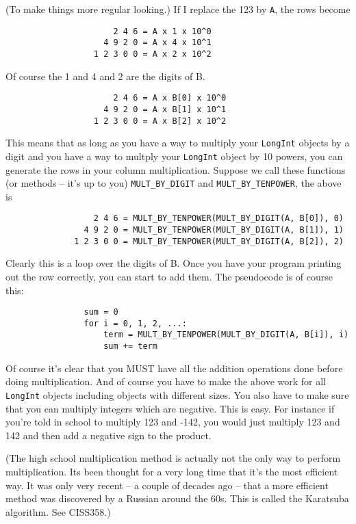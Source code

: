 (To make things more regular looking.) If I replace the 123 by \verb!A!, 
the rows become

\begin{Verbatim}
                      2 4 6 = A x 1 x 10^0
                    4 9 2 0 = A x 4 x 10^1
                  1 2 3 0 0 = A x 2 x 10^2
\end{Verbatim}

Of course the 1 and 4 and 2 are the digits of B.

\begin{Verbatim}
                      2 4 6 = A x B[0] x 10^0
                    4 9 2 0 = A x B[1] x 10^1
                  1 2 3 0 0 = A x B[2] x 10^2
\end{Verbatim}

This means that as long as you have a way to multiply your 
\verb!LongInt! objects by a digit and you have a way to multply 
your \verb!LongInt! object by 10 powers, you can generate the 
rows in your column multiplication. Suppose we call these 
functions (or methods – it's up to you) \verb!MULT_BY_DIGIT! 
and \verb!MULT_BY_TENPOWER!, the above is

\begin{Verbatim}
                  2 4 6 = MULT_BY_TENPOWER(MULT_BY_DIGIT(A, B[0]), 0)
                4 9 2 0 = MULT_BY_TENPOWER(MULT_BY_DIGIT(A, B[1]), 1)
              1 2 3 0 0 = MULT_BY_TENPOWER(MULT_BY_DIGIT(A, B[2]), 2)
\end{Verbatim}

Clearly this is a loop over the digits of B. Once you have your program 
printing out the row correctly, you can start to add them. The 
pseudocode is of course this:

\begin{Verbatim}
                sum = 0
                for i = 0, 1, 2, ...:
                    term = MULT_BY_TENPOWER(MULT_BY_DIGIT(A, B[i]), i)
                    sum += term
\end{Verbatim}

Of course it's clear that you MUST have all the addition operations 
done before doing multiplication. And of course you have to make the 
above work for all \verb!LongInt! objects including objects with 
different sizes. You also have to make sure that you can multiply 
integers which are negative. This is easy. For instance if you're 
told in school to multiply 123 and -142, you would just multiply 123 
and 142 and then add a negative sign to the product.

(The high school multiplication method is actually not the only 
way to perform multiplication. Its been thought for a very long time 
that it's the most efficient way. It was only very recent – a couple 
of decades ago – that a more efficient method was discovered by a 
Russian around the 60s. This is called the Karatsuba algorithm.
See CISS358.)


